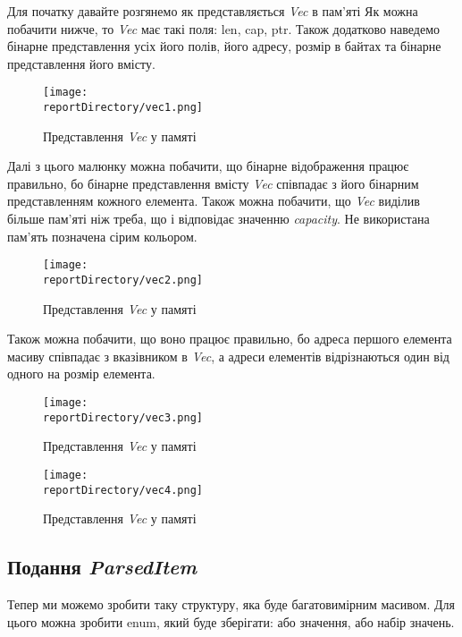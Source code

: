 Для початку давайте розгянемо як представляється \textit{Vec} в пам'яті
Як можна побачити нижче, то \textit{Vec} має такі поля: len, cap, ptr.
Також додатково наведемо бінарне представлення усіх його полів, його адресу, розмір в байтах
та бінарне представлення його вмісту.
\begin{figure}[h!]
    \centering
    \texttt{[image: \\reportDirectory/vec1.png]}
    \caption{Представлення \textit{Vec} у памяті}
    \label{fig:task}
\end{figure}

Далі з цього малюнку можна побачити, що бінарне відображення працює правильно,
бо бінарне представлення вмісту \textit{Vec} співпадає з його бінарним представленням кожного елемента.
Також можна побачити, що \textit{Vec} виділив більше пам'яті ніж треба,
що і відповідає значенню \textit{capacity}.
Не використана пам'ять позначена сірим кольором.
\begin{figure}[h!]
    \centering
    \texttt{[image: \\reportDirectory/vec2.png]}
    \caption{Представлення \textit{Vec} у памяті}
    \label{fig:task}
\end{figure}

Також можна побачити, що воно працює правильно,
бо адреса першого елемента масиву співпадає з вказівником в \textit{Vec},
а адреси елементів відрізнаються один від одного на розмір елемента.

\begin{figure}[h!]
    \centering
    \texttt{[image: \\reportDirectory/vec3.png]}
    \caption{Представлення \textit{Vec} у памяті}
    \label{fig:task}
\end{figure}

\begin{figure}[h!]
    \centering
    \texttt{[image: \\reportDirectory/vec4.png]}
    \caption{Представлення \textit{Vec} у памяті}
    \label{fig:task}
\end{figure}



\newpage
\subsection{Подання \textit{ParsedItem}}
Тепер ми можемо зробити таку структуру, яка буде багатовимірним масивом.
Для цього можна зробити enum, який буде зберігати: або значення, або набір значень.

